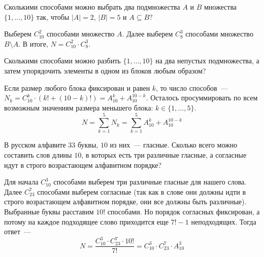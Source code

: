 \begin{Exercise}[counter=SecExercise]
    \noindent
    Сколькими способами можно выбрать два подмножества $ A $ и $ B $ множества $ \{1, \ldots, 10 \} $ так, чтобы $ |A| = 2 $, $ |B| = 5 $ и $ A \subseteq B $?
\end{Exercise}

\begin{Answer}
    \noindent
    Выберем $ C_{10}^2 $ способами множество $ A $.
    Далее выберем $ C_8^3 $ способами множество $ B \setminus A $.
    В итоге, $ N = C_{10}^2 \cdot C_8^3 $.
\end{Answer}

\begin{Exercise}[counter=SecExercise]
    \noindent
    Сколькими способами можно разбить $ \{ 1, \ldots, 10 \} $ на два непустых подмножества, а затем упорядочить элементы в одном из блоков любым образом?
\end{Exercise}

\begin{Answer}
    \noindent
    Если размер любого блока фиксирован и равен $ k $, то число способов~--- $ N_k = C_{10}^k \cdot (k! + (10 - k)!) = A_{10}^k + A_{10}^{10-k} $.
    Осталось просуммировать по всем возможным значениям размера меньшего блока: $ k \in \{1, \ldots, 5 \} $.
    \[
        N = \sum_{k=1}^5 N_k = \sum_{k=1}^5 A_{10}^k + A_{10}^{10-k}
    \]
\end{Answer}

\begin{Exercise}[counter=SecExercise]
    \noindent
    В русском алфавите $ 33 $ буквы, $ 10 $ из них~--- гласные.
    Сколько всего можно составить слов длины $ 10 $, в которых есть три различные гласные, а согласные идут в строго возрастающем алфавитном порядке?
\end{Exercise}

\begin{Answer}
    \noindent
    Для начала $ C_{10}^3 $ способами выберем три различные гласные для нашего слова.
    Далее $ C_{23}^7 $ способами выберем согласные
    (так как в слове они должны идти в строго возрастающем алфавитном порядке, они все должны быть различные).
    Выбранные буквы расставим $ 10! $ способами.
    Но порядок согласных фиксирован, а потому на каждое подходящее слово приходится еще $ 7! - 1 $ неподходящих.
    Тогда ответ~---
    \[
        N = \frac{C_{10}^3 \cdot C_{23}^7 \cdot 10!}{7!} = C_{10}^3 \cdot C_{23}^7 \cdot A_{10}^3
    \]
\end{Answer}

